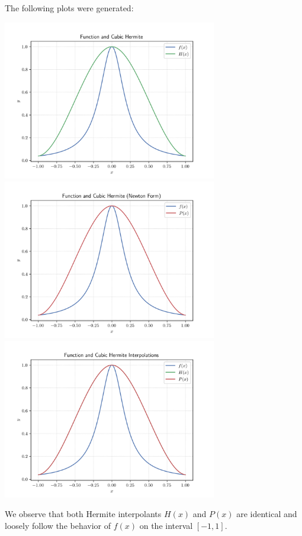 \documentclass[12pt]{article}
\begin{document}
\newpage
The following plots were generated:
\begin{center}
\includegraphics[width=0.7\textwidth]{../outputs_3/hermite_plot_h.png}
\includegraphics[width=0.7\textwidth]{../outputs_3/hermite_plot_p.png}
\includegraphics[width=0.7\textwidth]{../outputs_3/hermite_plot.png}
\end{center}

We observe that both Hermite interpolants $H(x)$ and $P(x)$ are identical and loosely follow the behavior of $f(x)$ on the interval $[-1,1]$.
\end{document}
